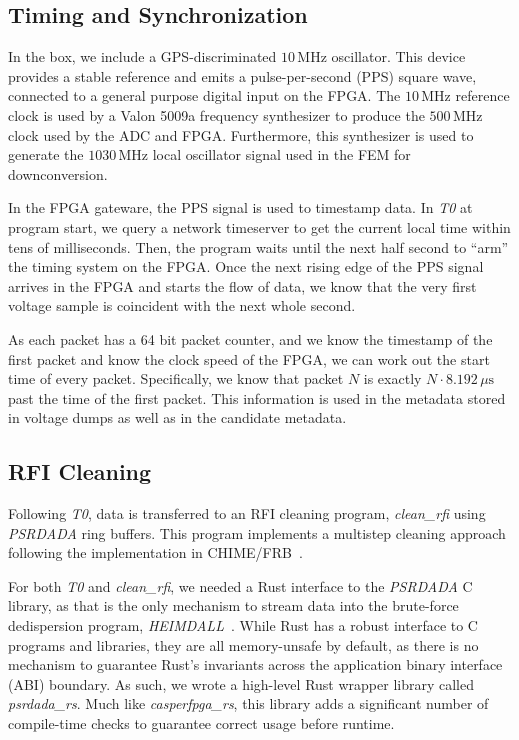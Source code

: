 \subsection{Timing and Synchronization} \label{sec:timing}
In the box, we include a GPS-discriminated $10\,\text{MHz}$ oscillator.
This device provides a stable reference and emits a pulse-per-second (PPS) square wave, connected to a general purpose digital input on the FPGA.
The $10\,\text{MHz}$ reference clock is used by a Valon 5009a frequency synthesizer to produce the $500\,\text{MHz}$ clock used by the ADC and FPGA.
Furthermore, this synthesizer is used to generate the $1030\,\text{MHz}$ local oscillator signal used in the FEM for downconversion.

In the FPGA gateware, the PPS signal is used to timestamp data.
In \textit{T0} at program start, we query a network timeserver to get the current local time within tens of milliseconds.
Then, the program waits until the next half second to ``arm'' the timing system on the FPGA.
Once the next rising edge of the PPS signal arrives in the FPGA and starts the flow of data, we know that the very first voltage sample is coincident with the next whole second.

As each packet has a 64 bit packet counter, and we know the timestamp of the first packet and know the clock speed of the FPGA, we can work out the start time of every packet.
Specifically, we know that packet $N$ is exactly $N\cdot8.192\,\mu\text{s}$ past the time of the first packet.
This information is used in the metadata stored in voltage dumps as well as in the candidate metadata.

\subsection{RFI Cleaning} \label{subsec:rfi_clean}

Following \textit{T0}, data is transferred to an RFI cleaning program, \textit{clean\_rfi} using \textit{PSRDADA} ring buffers.
This program implements a multistep cleaning approach following the implementation in CHIME/FRB~\cite{rafiei-ravandiMitigatingRadioFrequency2023}.

For both \textit{T0} and \textit{clean\_rfi}, we needed a Rust interface to the \textit{PSRDADA} C library, as that is the only mechanism to stream data into the brute-force dedispersion program, \textit{HEIMDALL}~\cite{barsdellAcceleratingIncoherentDedispersion2012}.
While Rust has a robust interface to C programs and libraries, they are all memory-unsafe by default, as there is no mechanism to guarantee Rust's invariants across the application binary interface (ABI) boundary.
As such, we wrote a high-level Rust wrapper library called \textit{psrdada\_rs}.
Much like \textit{casperfpga\_rs}, this library adds a significant number of compile-time checks to guarantee correct usage before runtime.

